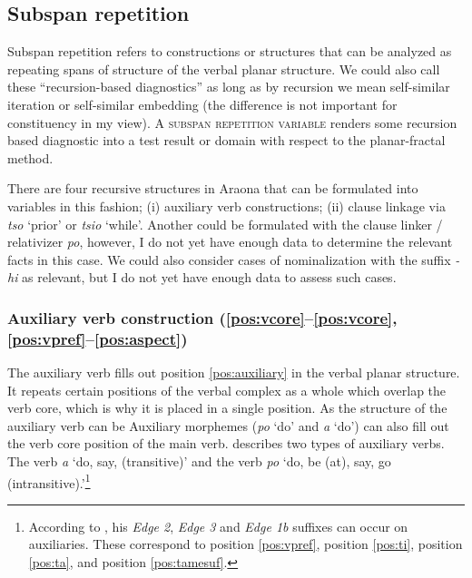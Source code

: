 \documentclass[output=paper,hidelinks]{langscibook}
\begin{document}

\subsection{Subspan repetition}

\label{araona:sec:recursion}

Subspan repetition refers to constructions or structures that can be analyzed as repeating spans of structure of the verbal planar structure. We could also call these ``recursion-based diagnostics'' as long as by recursion we mean self-similar iteration or self-similar embedding (the difference is not important for constituency in my view). A \textsc{subspan repetition variable} renders some recursion based diagnostic into a test result or domain with respect to the planar-fractal method.

There are four recursive structures in Araona that can be formulated into variables in this fashion; (i) auxiliary verb constructions; (ii) clause linkage via \textit{tso} `prior' or \textit{tsio} `while'. Another could be formulated with the clause linker / relativizer \textit{po}, however, I do not yet have enough data to determine the relevant facts in this case. We could also consider cases of nominalization with the suffix \textit{-hi} as relevant, but I do not yet have enough data to assess such cases.


\subsubsection{Auxiliary verb construction (\ref{pos:vcore}--\ref{pos:vcore}, \ref{pos:vpref}--\ref{pos:aspect})}
\label{sec:auxiliary}

The auxiliary verb fills out position \ref{pos:auxiliary} in the verbal planar structure. It repeats certain positions of the verbal complex as a whole which overlap the verb core, which is why it is placed in a single position. As the structure of the auxiliary verb can be  Auxiliary morphemes (\textit{po} `do' and \textit{a} `do') can also fill out the verb core position of the main verb. \citet[71]{pitman:1980:araonasketch} describes two types of auxiliary verbs. The verb \textit{a} `do, say, (transitive)' and the verb \textit{po} `do, be (at), say, go (intransitive).'\footnote{According to \citep{pitman:1980:araonasketch}, his \textit{Edge 2}, \textit{Edge 3} and \textit{Edge 1b} suffixes can occur on auxiliaries. These correspond to position \ref{pos:vpref}, position \ref{pos:ti}, position \ref{pos:ta}, and position \ref{pos:tamesuf}.}
\end{document}
